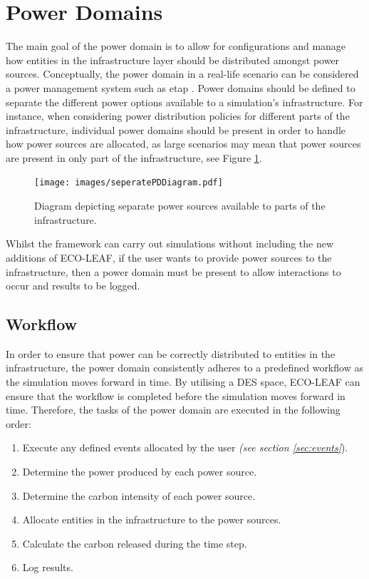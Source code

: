 \documentclass{l4proj}
\begin{document}
\section{Power Domains}\label{sec:power-domains}
The main goal of the power domain is to allow for configurations and manage how entities in the infrastructure layer should be distributed amongst power sources.
Conceptually, the power domain in a real-life scenario can be considered a power management system such as etap \citep{etap}.
Power domains should be defined to separate the different power options available to a simulation's infrastructure.
For instance, when considering power distribution policies for different parts of the infrastructure, individual power domains should be present in order to handle how power sources are allocated, as large scenarios may mean that power sources are present in only part of the infrastructure, see Figure \ref{fig:seperatePDs}.
\begin{figure}[htbp]
    \centering
    \texttt{[image: images/seperatePDDiagram.pdf]}
    ~
    \caption{Diagram depicting separate power sources available to parts of the infrastructure.}
    \label{fig:seperatePDs}
\end{figure}

Whilst the framework can carry out simulations without including the new additions of ECO-LEAF, if the user wants to provide power sources to the infrastructure, then a power domain must be present to allow interactions to occur and results to be logged.

\subsection{Workflow}\label{subsec:power-domain-workflow}
In order to ensure that power can be correctly distributed to entities in the infrastructure, the power domain consistently adheres to a predefined workflow as the simulation moves forward in time.
By utilising a DES space, ECO-LEAF can ensure that the workflow is completed before the simulation moves forward in time.
Therefore, the tasks of the power domain are executed in the following order:
\begin{enumerate}
    \item Execute any defined events allocated by the user \emph{(see section \ref{sec:events}}).
    \item Determine the power produced by each power source.
    \item Determine the carbon intensity of each power source.
    \item Allocate entities in the infrastructure to the power sources.
    \item Calculate the carbon released during the time step.
    \item Log results.
\end{enumerate}
\end{document}
